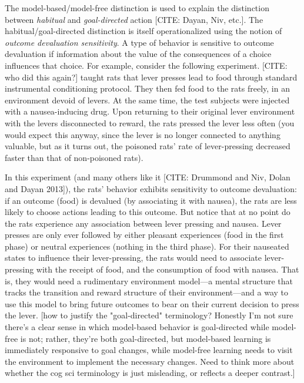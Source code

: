 The model-based/model-free distinction is used to explain the distinction between \emph{habitual} and \emph{goal-directed} action [CITE: Dayan, Niv, etc.].
The habitual/goal-directed distinction is itself operationalized using the notion of \emph{outcome devaluation sensitivity}.
A type of behavior is sensitive to outcome devaluation if information about the value of the consequences of a choice influences that choice.
For example, consider the following experiment.
[CITE: who did this again?] taught rats that lever presses lead to food through standard instrumental conditioning protocol.
They then fed food to the rats freely, in an environment devoid of levers.
At the same time, the test subjects were injected with a nausea-inducing drug.
Upon returning to their original lever environment with the levers disconnected to reward, the rats pressed the lever less often (you would expect this anyway, since the lever is no longer connected to anything valuable, but as it turns out, the poisoned rats' rate of lever-pressing decreased faster than that of non-poisoned rats).

In this experiment (and many others like it [CITE: Drummond and Niv, Dolan and Dayan 2013]), the rats' behavior exhibits sensitivity to outcome devaluation: if an outcome (food) is devalued (by associating it with nausea), the rats are less likely to choose actions leading to this outcome.
But notice that at no point do the rats experience any association between lever pressing and nausea.
Lever presses are only ever followed by either pleasant experiences (food in the first phase) or neutral experiences (nothing in the third phase).
For their nauseated states to influence their lever-pressing, the rats would need to associate lever-pressing with the receipt of food, and the consumption of food with nausea.
That is, they would need a rudimentary environment model---a mental structure that tracks the transition and reward structure of their environment---and a way to use this model to bring future outcomes to bear on their current decision to press the lever.
[how to justify the "goal-directed" terminology? Honestly I'm not sure there's a clear sense in which model-based behavior is goal-directed while model-free is not; rather, they're both goal-directed, but model-based learning is immediately responsive to goal changes, while model-free learning needs to visit the environment to implement the necessary changes. Need to think more about whether the cog sci terminology is just misleading, or reflects a deeper contrast.]





